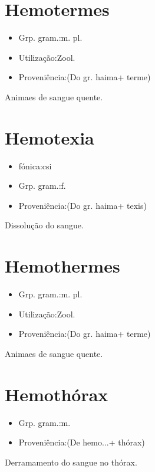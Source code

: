 \documentclass{article}
\begin{document}
\section{Hemotermes}
\begin{itemize}
\item {Grp. gram.:m. pl.}
\end{itemize}
\begin{itemize}
\item {Utilização:Zool.}
\end{itemize}
\begin{itemize}
\item {Proveniência:(Do gr. \textunderscore haima\textunderscore  + \textunderscore terme\textunderscore )}
\end{itemize}
Animaes de sangue quente.
\section{Hemotexia}
\begin{itemize}
\item {fónica:csi}
\end{itemize}
\begin{itemize}
\item {Grp. gram.:f.}
\end{itemize}
\begin{itemize}
\item {Proveniência:(Do gr. \textunderscore haima\textunderscore  + \textunderscore texis\textunderscore )}
\end{itemize}
Dissolução do sangue.
\section{Hemothermes}
\begin{itemize}
\item {Grp. gram.:m. pl.}
\end{itemize}
\begin{itemize}
\item {Utilização:Zool.}
\end{itemize}
\begin{itemize}
\item {Proveniência:(Do gr. \textunderscore haima\textunderscore  + \textunderscore terme\textunderscore )}
\end{itemize}
Animaes de sangue quente.
\section{Hemothórax}
\begin{itemize}
\item {Grp. gram.:m.}
\end{itemize}
\begin{itemize}
\item {Proveniência:(De \textunderscore hemo...\textunderscore  + \textunderscore thórax\textunderscore )}
\end{itemize}
Derramamento do sangue no thórax.
\end{document}
